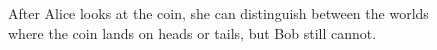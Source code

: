 \begin{example}
\begin{figure}\label{semantics-coin-s5-2}
\begin{center} 
\caption{
After Alice looks at the coin, she can distinguish between the worlds where the
coin lands on heads or tails, but Bob still cannot.
}
\end{center}
\end{figure}
\end{example}

